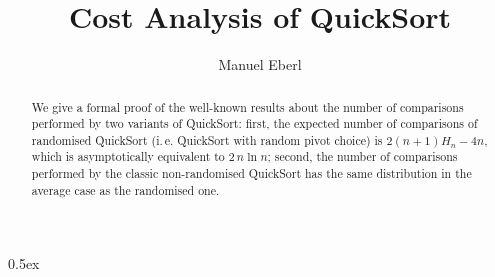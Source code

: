\documentclass[11pt,a4paper]{article}
\begin{document}
\title{Cost Analysis of QuickSort}
\author{Manuel Eberl}
\maketitle

\begin{abstract}
We give a formal proof of the well-known results about the number of comparisons performed by two variants of QuickSort: first, the expected number of comparisons of randomised QuickSort (i.\,e. QuickSort with random pivot choice) is $2(n+1)H_n - 4n$, which is asymptotically equivalent to $2\,n\ln n$; second, the number of comparisons performed by the classic non-randomised QuickSort has the same distribution in the average case as the randomised one.
\end{abstract}

\tableofcontents
\newpage
\parindent 0pt\parskip 0.5ex





\end{document}

